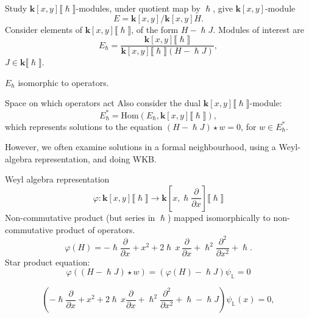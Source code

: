     
\begin{frame}
    Study \(\mathbf{k}[x,y] \lBrack \hslash \rBrack\)-modules, under quotient map by \(\hslash\), give  \(\mathbf{k}[x,y]\)-module \[E =\mathbf{k}[x,y]/ \mathbf{k}[x,y] H   . \] 
    Consider elements of \( \mathbf{k}[x,y]\lBrack\hslash\rBrack\), of the form \(H - \hslash J\). 
    Modules of interest are
    \begin{equation*}  
    E_{\hslash} = \frac{\mathbf{k}[x,y] \lBrack \hslash \rBrack}{  \mathbf{k}[x,y] \lBrack \hslash \rBrack (H - \hslash J)  } ,
    \end{equation*}
    \(J \in \mathbf{k}\lBrack\hslash\rBrack\). 
    
    \( E_{\hslash}\) isomorphic to operators.
    
\end{frame}    

\begin{frame}{Space on which operators act}
    Also consider the dual  \( \mathbf{k}[x,y] \lBrack \hslash \rBrack\)-module:
    \begin{equation*} 
    E_{\hslash}^{*} = \mathrm{Hom} \left(E_{\hslash}, \mathbf{k}[x,y] \lBrack \hslash \rBrack \right),
    \end{equation*}
    which represents solutions to the equation \( (H - \hslash J) \star w =0\), for \( w \in  E_{\hslash}^{*}\).
    
    However, we often examine solutions in a formal neighbourhood, using a Weyl-algebra representation, and doing WKB.
\end{frame}

\begin{frame}{Weyl algebra representation}
    \[\varphi: \mathbf{k}[x,y]\lBrack \hslash \rBrack \rightarrow \mathbf{k}[x,\hslash \frac{\partial}{\partial x}]\lBrack \hslash \rBrack\]
    Non-commutative product (but series in \(\hslash\)) mapped isomorphically to non-commutative product of operators.
    \[  \varphi(H)  = - \hslash\frac{ \partial}{\partial x} +  x^2 + 2  \hslash\, x \, \frac{ \partial }{\partial x} + \hslash^2  \frac{\partial^2}{\partial x^2} + \hslash. \]
    Star product equation:
    \[ \varphi((H-\hslash J) \star w) = (\varphi(H)- \hslash J) \psi_{\mathbb{L}} = 0\]
\end{frame}

\begin{frame}
\[
    \left( - \hslash \frac{\partial }{\partial x} +  x^2 + 2  \hslash\, x \frac{ \partial }{\partial x}+ \hslash^2  \frac{\partial^2 }{\partial x^2}  + \hslash - \hslash J\right) \psi_{\mathbb{L}}(x)  = 0, \]
\end{frame}

